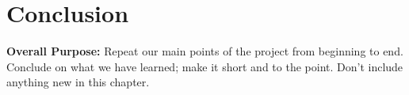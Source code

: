 \section{Conclusion}
\textbf{Overall Purpose:} Repeat our main points of the project from beginning to end. Conclude on what we have learned; make it short and to the point.	
Don’t include anything new in this chapter.
